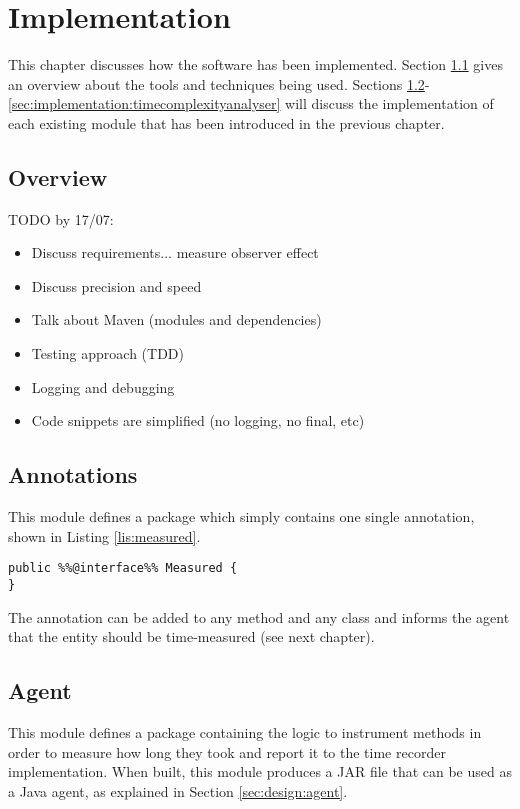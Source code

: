 \chapter{Implementation}

This chapter discusses how the software has been implemented. Section \ref{sec:implementation:overview} gives an overview about the tools and techniques being used. Sections \ref{sec:implementation:annotations}-\ref{sec:implementation:timecomplexityanalyser} will discuss the implementation of each existing module that has been introduced in the previous chapter.

\section{Overview}
\label{sec:implementation:overview}

TODO by 17/07:
\begin{itemize}
  \item Discuss requirements... measure observer effect
  \item Discuss precision and speed
  \item Talk about Maven (modules and dependencies)
  \item Testing approach (TDD)
  \item Logging and debugging
  \item Code snippets are simplified (no logging, no final, etc)
\end{itemize}

\section{Annotations}
\label{sec:implementation:annotations} 
This module defines a package  which simply contains one single annotation, shown in Listing \ref{lis:measured}.
\begin{lstlisting}[caption={Measured annotation},label=lis:measured]
public %%@interface%% Measured {
}
\end{lstlisting}

\noindent The annotation can be added to any method and any class and informs the agent that the entity should be time-measured (see next chapter).


\section{Agent}
This module defines a package  containing the logic to instrument methods in order to measure how long they took and report it to the time recorder implementation. When built, this module produces a JAR file that can be used as a Java agent, as explained in Section \ref{sec:design:agent}.

